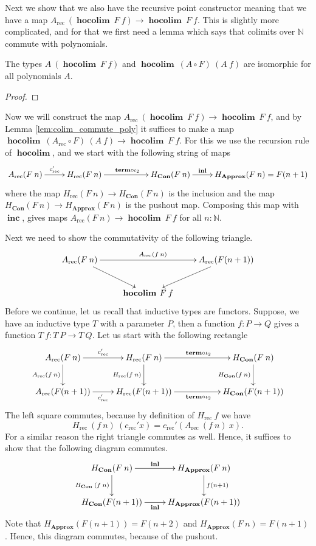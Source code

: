 \documentclass[a4paper,UKenglish]{lipics-v2016}
\newcommand{\rec}[0]{\operatorname{rec}}
\newcommand{\term}[0]{\textbf{term}}
\newcommand{\Con}[0]{\textbf{Con}}
\newcommand{\Approx}[0]{\textbf{Approx}}
\newcommand{\hocolim}[0]{\operatorname{\textbf{hocolim}}}
\newcommand{\inl}[0]{\operatorname{\textbf{inl}}}
\newcommand{\inc}[0]{\operatorname{\textbf{inc}}}
\begin{document}
Next we show that we also have the recursive point constructor meaning that we have a map $A_{\rec} \> (\hocolim \> F \> f) \rightarrow \hocolim \> F \> f$.
This is slightly more complicated, and for that we first need a lemma which says that colimits over $\mathbb{N}$ commute with polynomials.

\begin{lemma}
\label{lem:colim_commute_poly}
The types $A \> (\hocolim \> F \> f)$ and $\hocolim \> (A \circ F) \> (A \> f)$ are isomorphic for all polynomials $A$.
\end{lemma}

\begin{proof}

\end{proof}

Now we will construct the map $A_{\rec} \> (\hocolim \> F \> f) \rightarrow \hocolim \> F \> f$, and by Lemma \ref{lem:colim_commute_poly} it suffices to make a map $\hocolim \> (A_{\rec} \circ F) \> (A \> f) \rightarrow \hocolim \> F \> f$.
For this we use the recursion rule of $\hocolim$, and we start with the following string of maps
\[
\xymatrix
{
		A_{\rec}(F \> n) \ar[r]^-{c_{\rec}'} 
		& H_{\rec}(F \> n) \ar[rr]^{\term \circ \iota_2} &
		& H_{\Con}(F \> n) \ar[r]^-{\inl}
		& H_{\Approx}(F \> n) = F(n + 1)
}
\]
where the map $H_{\rec}(F \> n) \rightarrow H_{\Con}(F \> n)$ is the inclusion and the map $H_{\Con}(F \> n) \rightarrow H_{\Approx}(F \> n)$ is the pushout map.
Composing this map with $\inc$, gives maps $A_{\rec}(F \> n) \rightarrow \hocolim \> F \> f$ for all $n : \mathbb{N}$.

Next we need to show the commutativity of the following triangle.
\[
\xymatrix
{
	A_{\rec}(F \> n) \ar[rr]^{A_{\rec}(f \> n)} \ar[dr] & & A_{\rec}(F(n+1)) \ar[dl] \\
	& \hocolim \> F \> f &
}
\]
Before we continue, let us recall that inductive types are functors.
Suppose, we have an inductive type $T$ with a parameter $P$, then a function $f : P \rightarrow Q$ gives a function $T \> f : T \> P \rightarrow T \> Q$.
Let us start with the following rectangle
\[
\xymatrix
{
	A_{\rec}(F \> n) \ar[r]^-{c_{\rec}'} \ar[d]_{A_{\rec}(f \> n)} 
		& H_{\rec}(F \> n) \ar[rr]^{\term \circ \iota_2} \ar[d]_{H_{\rec}(f \> n)} &
		& H_{\Con}(F \> n) \ar[d]_{H_{\Con}(f \> n)}\\
	A_{\rec}(F(n+1)) \ar[r]_-{c_{\rec}'} 
		& H_{\rec}(F(n+1)) \ar[rr]_{\term \circ \iota_2} &
		& H_{\Con}(F(n+1))
}
\]
The left square commutes, because by definition of $H_{\rec} \> f$ we have
\[
H_{\rec} \>(f \> n) \> (c_{\rec}' x) = c_{\rec}' (A_{\rec} \> (f \> n) \> x).
\]
For a similar reason the right triangle commutes as well.
Hence, it suffices to show that the following diagram commutes.
\[
\xymatrix
{
	H_{\Con}(F \> n) \ar[d]_{H_{\Con} \> (f \> n)} \ar[r]^-{\inl}
		& H_{\Approx}(F \> n) \ar[d]^{f(n+1)}\\
	H_{\Con}(F(n+1)) \ar[r]_-{\inl}
		& H_{\Approx}(F(n+1))
}
\]
Note that $H_{\Approx}(F(n+1)) = F(n+2)$ and $H_{\Approx}(F \> n) = F(n+1)$.
Hence, this diagram commutes, because of the pushout.
\end{document}
